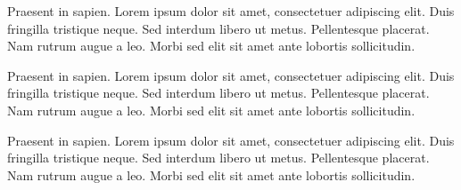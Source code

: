 

Praesent in sapien. Lorem ipsum dolor sit amet, consectetuer adipiscing elit.
Duis fringilla tristique neque. Sed interdum libero ut metus. Pellentesque placerat.
Nam rutrum augue a leo. Morbi sed elit sit amet ante lobortis sollicitudin.




Praesent in sapien. Lorem ipsum dolor sit amet, consectetuer adipiscing elit.
Duis fringilla tristique neque. Sed interdum libero ut metus. Pellentesque placerat.
Nam rutrum augue a leo. Morbi sed elit sit amet ante lobortis sollicitudin.




Praesent in sapien. Lorem ipsum dolor sit amet, consectetuer adipiscing elit.
Duis fringilla tristique neque. Sed interdum libero ut metus. Pellentesque placerat.
Nam rutrum augue a leo. Morbi sed elit sit amet ante lobortis sollicitudin.

\clearpage %
